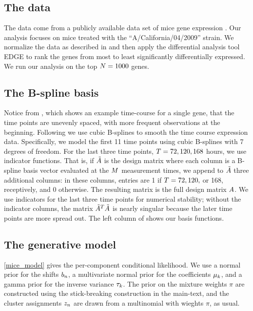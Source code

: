 \subsection{The data}
The data come from a publicly available data set of mice gene expression
\citep{shoemaker:2015:ultrasensitive}.
Our analysis focuses on mice treated with the ``A/California/04/2009'' strain.
We normalize the data as described in
\citet{shoemaker:2015:ultrasensitive} and then apply the differential
analysis tool EDGE \citep{Storey:2005:significance} to rank the genes from most to least significantly differentially expressed.
We run our analysis on the top $N = 1000$ genes.

\subsection{The B-spline basis}
Notice from , which shows an example time-course for a single gene,
that the time points are unevenly spaced, with more frequent observations at the beginning.
Following \citet{Luan:2003:clustering} we use cubic B-splines to smooth the time course expression data.
Specifically, we model the first 11 time points using
cubic B-splines with 7 degrees of freedom.
For the last three time points, $T = 72, 120, 168$ hours,
we use indicator functions.
That is, if $\tilde {A}$ is the design
matrix where each column is a
B-spline basis vector evaluated at the $M$ measurement times,
we append to $\tilde {A}$ three additional columns:
in these columns, entries are 1
if $T = 72, 120,$ or 168, receptively, and 0 otherwise.
The resulting matrix is the full design matrix $A$.
We use indicators for the last three time points for numerical stability;
without the indicator columns,
the matrix $\tilde {A}^T \tilde {A}$ is nearly singular
because the later time points are more spread out.
The left column of  shows our basis functions.

\subsection{The generative model}
\eqref{mice_model} gives the per-component conditional likelihood.
We use a normal prior for the shifts $b_n$,
a multivariate normal prior for the coefficients $\mu_k$,
and a gamma prior for the inverse variance $\tau_k$.
The prior on the mixture weights $\pi$ are constructed using the stick-breaking
construction in the main-text, and the cluster assignments $z_n$
are drawn from a multinomial with wieghts $\pi$, as usual.



